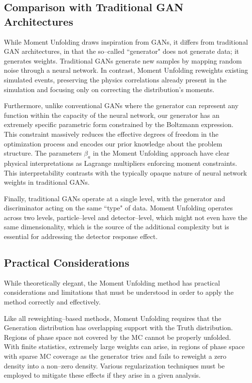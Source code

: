     \subsection{Comparison with Traditional GAN Architectures}
        While Moment Unfolding draws inspiration from GANs, it differs from traditional GAN architectures, in that the so--called ``generator" does not generate data; it generates weights.
        Traditional GANs generate new samples by mapping random noise through a neural network.
        In contrast, Moment Unfolding reweights existing simulated events, preserving the physics correlations already present in the simulation and focusing only on correcting the distribution's moments.
    
        Furthermore, unlike conventional GANs where the generator can represent any function within the capacity of the neural network, our generator has an extremely specific parametric form constrained by the Boltzmann expression.
        This constraint massively reduces the effective degrees of freedom in the optimization process and encodes our prior knowledge about the problem structure.
        The parameters $\beta_a$ in the Moment Unfolding approach have clear physical interpretations as Lagrange multipliers enforcing moment constraints.
        This interpretability contrasts with the typically opaque nature of neural network weights in traditional GANs.
    
        Finally, traditional GANs operate at a single level, with the generator and discriminator acting on the same ``type" of data.
        Moment Unfolding operates across two levels, particle--level and detector--level, which might not even have the same dimensionality, which is the source of the additional complexity but is essential for addressing the detector response effect.
    \subsection{Practical Considerations}
        While theoretically elegant, the Moment Unfolding method has practical considerations and limitations that must be understood in order to apply the method correctly and effectively.

        Like all reweighting--based methods, Moment Unfolding requires that the Generation distribution has overlapping support with the Truth distribution.
        Regions of phase space not covered by the MC cannot be properly unfolded.
        With finite statistics, extremely large weights can arise, in regions of phase space with sparse MC coverage as the generator tries and fails to reweight a zero density into a non--zero density.
        Various regularization techniques must be employed to mitigate these effects if they arise in a given analysis.
        
